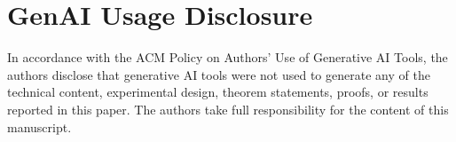 \documentclass[sigconf,anonymous,review]{acmart}
\begin{document}
\section*{GenAI Usage Disclosure}
In accordance with the ACM Policy on Authors' Use of Generative AI
Tools, the authors disclose that generative AI tools were not used
to generate any of the technical content, experimental design,
theorem statements, proofs, or results reported in this paper. The
authors take full responsibility for the content of this manuscript.





\end{document}
